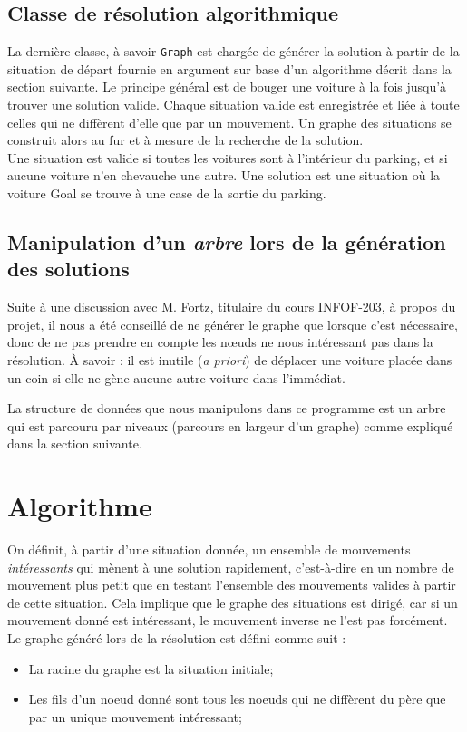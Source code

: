 \documentclass{article}
\begin{document}
    \subsection{Classe de résolution algorithmique}
        La dernière classe, à savoir \texttt{Graph} est chargée de générer la solution à partir de la situation de départ fournie en argument
        sur base d'un algorithme décrit dans la section suivante. Le principe général est de bouger une voiture à la fois jusqu'à trouver une
		solution valide. Chaque situation valide est enregistrée et liée à toute celles qui ne diffèrent d'elle que par un mouvement.
		Un graphe des situations se construit alors au fur et à mesure de la recherche de la solution.\\
		Une situation est valide si toutes les voitures sont à l'intérieur du parking, et si aucune voiture n'en chevauche une autre.
		Une solution est une situation où la voiture Goal se trouve à une case de la sortie du parking.

    \subsection{Manipulation d'un \textit{arbre} lors de la génération des solutions}
        Suite à une discussion avec M. Fortz, titulaire du cours INFOF-203, à propos du projet, il nous a été conseillé de ne générer le graphe
        que lorsque c'est nécessaire, donc de ne pas prendre en compte les nœuds ne nous intéressant pas dans la résolution. À savoir : il est
        inutile (\textit{a priori}) de déplacer une voiture placée dans un coin si elle ne gène aucune autre voiture dans l'immédiat.

        La structure de données que nous manipulons dans ce programme est un arbre qui est parcouru par niveaux (parcours en largeur d'un graphe)
        comme expliqué dans la section suivante.

\section{Algorithme}
		On définit, à partir d'une situation donnée, un ensemble de mouvements \textit{intéressants} qui mènent
		à une solution rapidement, c'est-à-dire en un nombre de mouvement plus petit que en testant l'ensemble des mouvements valides à
		partir de cette situation. Cela implique que le graphe des situations est dirigé, car si un mouvement donné est intéressant,
		le mouvement inverse ne l'est pas forcément. \\
		Le graphe généré lors de la résolution est défini comme suit :
		\begin{itemize}
			\item La racine du graphe est la situation initiale;
			\item Les fils d'un noeud donné sont tous les noeuds qui ne diffèrent du père que par un unique mouvement intéressant;
		\end{itemize}
\end{document}
